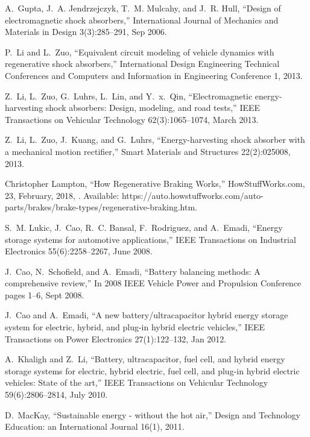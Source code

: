 A.~Gupta, J.~A. Jendrzejczyk, T.~M. Mulcahy, and J.~R. Hull,
\newblock ``Design of electromagnetic shock absorbers,''
\newblock International Journal of Mechanics and Materials in Design
  3(3):285--291, Sep 2006.

P.~Li and L.~Zuo,
\newblock ``Equivalent circuit modeling of vehicle dynamics with regenerative shock absorbers,''
\newblock International Design Engineering Technical Conferences and
  Computers and Information in Engineering Conference 1, 2013.

Z.~Li, L.~Zuo, G.~Luhrs, L.~Lin, and Y.~x.~Qin,
\newblock ``Electromagnetic energy-harvesting shock absorbers: Design, modeling, and road tests,''
\newblock IEEE Transactions on Vehicular Technology 62(3):1065--1074,
  March 2013.

Z.~Li, L.~Zuo, J.~Kuang, and G.~Luhrs,
\newblock ``Energy-harvesting shock absorber with a mechanical motion rectifier,''
\newblock Smart Materials and Structures 22(2):025008, 2013.

Christopher Lampton,
\newblock ``How Regenerative Braking Works,''
\newblock HowStuffWorks.com, 23, February, 2018, 
\newblock [Online]. Available: https://auto.howstuffworks.com/auto-parts/brakes/brake-types/regenerative-braking.htm.

S.~M. Lukic, J.~Cao, R.~C. Bansal, F.~Rodriguez, and A.~Emadi,
\newblock ``Energy storage systems for automotive applications,''
\newblock IEEE Transactions on Industrial Electronics 55(6):2258--2267,
  June 2008.

J.~Cao, N.~Schofield, and A.~Emadi,
\newblock ``Battery balancing methods: A comprehensive review,''
\newblock In 2008 IEEE Vehicle Power and Propulsion Conference pages
  1--6, Sept 2008.

J.~Cao and A.~Emadi,
\newblock ``A new battery/ultracapacitor hybrid energy storage system for
  electric, hybrid, and plug-in hybrid electric vehicles,''
\newblock IEEE Transactions on Power Electronics 27(1):122--132, Jan
  2012.

A.~Khaligh and Z.~Li,
\newblock ``Battery, ultracapacitor, fuel cell, and hybrid energy storage systems for electric, hybrid electric, fuel cell, and plug-in hybrid electric
  vehicles: State of the art,''
\newblock IEEE Transactions on Vehicular Technology 59(6):2806--2814,
  July 2010.

D.~MacKay,
\newblock ``Sustainable energy - without the hot air,''
\newblock Design and Technology Education: an International Journal
  16(1), 2011.

